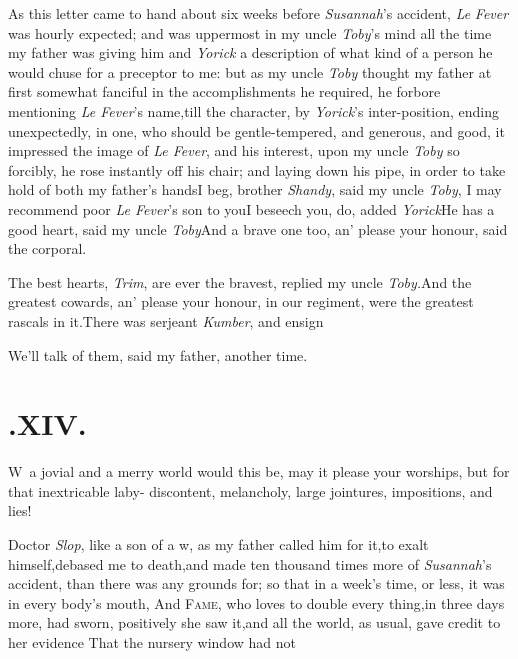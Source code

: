 \documentclass{article}
\begin{document}
As this letter came to hand about six weeks before
\textit{Susannah}’s accident, \textit{Le} \textit{Fever} was hourly
expected; and was uppermost in my uncle \textit{Toby}’s mind
all the time my father was giving him and \textit{Yorick} a
description of what kind of a person he would chuse for a preceptor
to me: but as my uncle \textit{Toby} thought my father at first somewhat fanciful in the
accomplishments he required, he forbore mentioning \textit{Le
Fever}’s name,\tsh till the character, by
\textit{Yorick}’s inter-position, ending unexpectedly, in one,
who should be gentle-tempered, and generous, and good, it impressed
the image of \textit{Le Fever}, and his interest, upon my uncle
\textit{Toby} so forcibly, he rose instantly off his chair; and
laying down his pipe, in order to take hold of both my
father’s hands\tsh I beg, brother \textit{Shandy},
said my uncle \textit{Toby}, I may recommend poor \textit{Le
Fever}’s son to you\tsk I beseech you, do, added
\textit{Yorick}\tsh He has a good heart, said my uncle
\textit{Toby}\tsh And a brave one too, an’ please your
honour, said the corporal.

\tsh The best hearts, \textit{Trim}, are ever the
bravest, replied my uncle \textit{Toby.}\tsh And the
greatest cowards, an’ please your honour, in our regiment,
were the greatest rascals in it.\tsk There was serjeant
\textit{Kumber}, and ensign\tsh

\tsh We’ll talk of them, said my father, another
time.

\smallskip

\section{.\enspace XIV.}

\lettrine{W}{\,} a jovial and a merry world would
this be, may it please your\break 
worships, but for that inextricable laby-\break
{}
discontent, melancholy, large jointures, impositions, and lies!

Doctor \textit{Slop}, like a son of a w\tsk, as\break
my father called him for it,\tsk to exalt\break
himself,\tsk debased me to death,\tsk and\break
made ten thousand times more of
\textit{Susannah}’s accident, than there was any grounds for;
so that in a week’s time, or less, it was in every
body’s mouth,\break
{}
\break
And \textsc{Fame}, who loves to
double every thing,\tsk in three days more, had sworn, positively
she saw it,\tsk and all the world, as usual, gave credit to her
evidence\tsh\break
\lqq That the nursery window had not\break
{}
\stick{\astfill}
\stick{\astfill}
\etp{}
\end{document}
